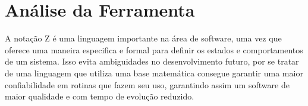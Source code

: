 \chapter{Análise da Ferramenta}

    A notação Z é uma linguagem importante na área de software, uma vez que oferece uma maneira especifica e formal para definir os estados e comportamentos de um sistema. Isso evita ambiguidades no desenvolvimento futuro, por se tratar de uma linguagem que utiliza uma base matemática consegue garantir uma maior confiabilidade em rotinas que fazem seu uso, garantindo assim um software de maior qualidade e com tempo de evolução reduzido.
    